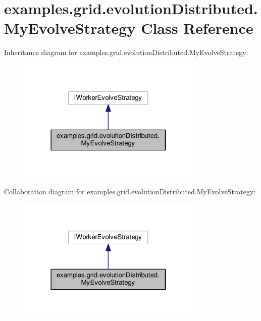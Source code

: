 \hypertarget{classexamples_1_1grid_1_1evolution_distributed_1_1_my_evolve_strategy}{\section{examples.\-grid.\-evolution\-Distributed.\-My\-Evolve\-Strategy Class Reference}
\label{classexamples_1_1grid_1_1evolution_distributed_1_1_my_evolve_strategy}
}


Inheritance diagram for examples.\-grid.\-evolution\-Distributed.\-My\-Evolve\-Strategy\-:
\nopagebreak
\begin{figure}[H]
\begin{center}
\leavevmode
\includegraphics[width=250pt]{classexamples_1_1grid_1_1evolution_distributed_1_1_my_evolve_strategy__inherit__graph}
\end{center}
\end{figure}


Collaboration diagram for examples.\-grid.\-evolution\-Distributed.\-My\-Evolve\-Strategy\-:
\nopagebreak
\begin{figure}[H]
\begin{center}
\leavevmode
\includegraphics[width=250pt]{classexamples_1_1grid_1_1evolution_distributed_1_1_my_evolve_strategy__coll__graph}
\end{center}
\end{figure}

